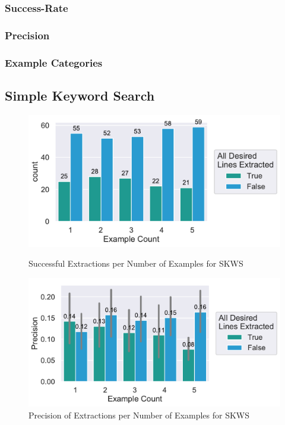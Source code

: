 \documentclass[\myrootdir/main.tex]{subfiles}
\begin{document}
\subsubsection{Success-Rate}
\subsubsection{Precision}
\subsubsection{Example Categories}


\subsection{Simple Keyword Search}

\begin{figure}[htbp]
	\centering
	\begin{minipage}{0.45\textwidth}
		\centering
		\includegraphics[width=\textwidth, clip]{img/big-study/success-examples-SKWS.pdf}
		\caption{Successful Extractions per Number of Examples for SKWS}
		\label{fig:success-examples-skws}
	\end{minipage}\hfill
	\begin{minipage}{0.45\textwidth}
		\centering
		\includegraphics[width=\textwidth, clip]{img/big-study/precision-SKWS.pdf}
		\caption{Precision of Extractions per Number of Examples for SKWS}
		\label{fig:precision-skws}
	\end{minipage}
\end{figure}
\end{document}
